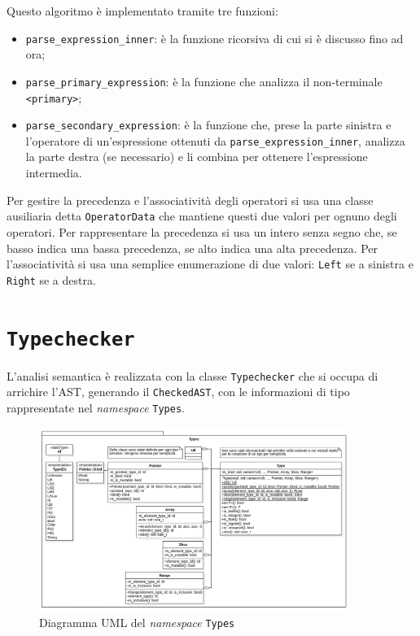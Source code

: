 Questo algoritmo \`e implementato tramite tre funzioni:
\begin{itemize}
	\item \texttt{parse\_expression\_inner}: \`e la funzione ricorsiva di cui si \`e discusso fino ad ora;
	\item \texttt{parse\_primary\_expression}: \`e la funzione che analizza il non-terminale \texttt{<primary>};
	\item \texttt{parse\_secondary\_expression}: \`e la funzione che, prese la parte sinistra e l'operatore di un'espressione ottenuti da \linebreak \texttt{parse\_expression\_inner}, analizza la parte destra (se necessario) e li combina per ottenere l'espressione intermedia.
\end{itemize}
Per gestire la precedenza e l'associativit\`a degli operatori si usa una classe ausiliaria detta \texttt{OperatorData} che mantiene questi due valori per ognuno degli operatori. Per rappresentare la precedenza si usa un intero senza segno che, se basso indica una bassa precedenza, se alto indica una alta precedenza. Per l'associativit\`a si usa una semplice enumerazione di due valori: \texttt{Left} se a sinistra e \texttt{Right} se a destra.

\section{\texttt{Typechecker}}
\label{sec:typechecker}

L'analisi semantica \`e realizzata con la classe \texttt{Typechecker} che si occupa di arrichire l'AST, generando il \texttt{CheckedAST}, con le informazioni di tipo rappresentate nel \textit{namespace} \texttt{Types}.

\begin{figure}[H]
	\centering
	\includegraphics[width=0.9\textwidth]{figures/types.png}
	\caption{Diagramma UML del \textit{namespace} \texttt{Types}}
	\label{fig:typechecker-types}
\end{figure}

